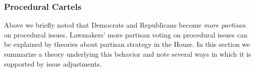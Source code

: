 


\subsubsection{Procedural Cartels}
\label{sec:procedural_cartel_theory}
Above we briefly noted that Democrats and Republicans become
\emph{more partisan} on procedural issues.  Lawmakers' more partisan
voting on procedural issues can be explained by theories about
partisan strategy in the House.  In this section we summarize a theory
underlying this behavior and note several ways in which it is
supported by issue adjustments.


